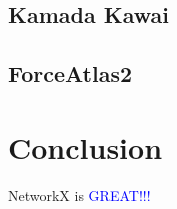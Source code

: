\documentclass[11pt]{beamer}
\begin{document}
\subsection{Kamada Kawai}
\begin{frame}{\subsecname}
    \resizebox{0.8\textwidth}{!}{}
\end{frame}

\subsection{ForceAtlas2}
\begin{frame}{\subsecname}
    \resizebox{0.8\textwidth}{!}{}
\end{frame}

\section{Conclusion}
\begin{frame}{\secname}
    \begin{block}{}
        NetworkX is \Huge\textcolor{blue}{GREAT!!!}
    \end{block}
\end{frame}
\end{document}
